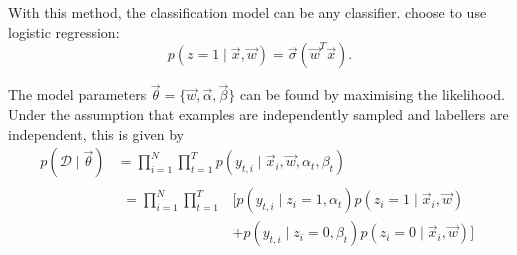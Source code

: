             With this method, the classification model can be any classifier. \citeauthor{raykar10} choose to use logistic regression:
            \begin{equation*}
                p(z = 1 \mid \vec x, \vec w) = \vec\sigma(\vec w^T \vec x).
            \end{equation*}

            The model parameters $\vec \theta = \{\vec w, \vec \alpha, \vec \beta\}$ can be found by maximising the likelihood. Under the assumption that examples are independently sampled and labellers are independent, this is given by
            \begin{align*}
                p(\mathcal D \mid \vec \theta) &= \prod_{i = 1}^N \prod_{t = 1}^T p(y_{t, i} \mid \vec x_i, \vec w, \alpha_t, \beta_t)\\
                &\begin{aligned}= \prod_{i = 1}^N \prod_{t = 1}^T &\bigg[p(y_{t, i} \mid z_i = 1, \alpha_t) p(z_i = 1 \mid \vec x_i, \vec w)\\
                                                                  &+ p(y_{t, i} \mid z_i = 0, \beta_t) p(z_i = 0 \mid \vec x_i, \vec w)\bigg]\end{aligned}
            \end{align*}
